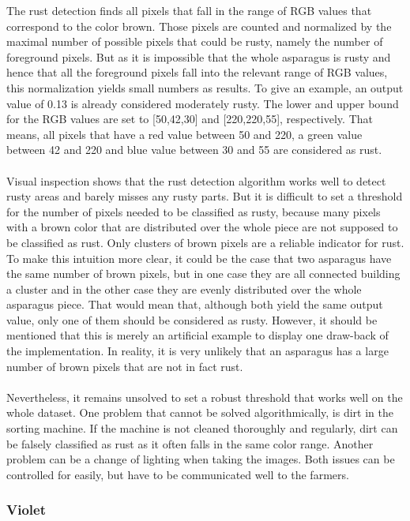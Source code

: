 The rust detection finds all pixels that fall in the range of RGB values that correspond to the color brown. Those pixels are counted and normalized by the maximal number of possible pixels that could be rusty, namely the number of foreground pixels. But as it is impossible that the whole asparagus is rusty and hence that all the foreground pixels fall into the relevant range of RGB values, this normalization yields small numbers as results. To give an example, an output value of 0.13 is already considered moderately rusty. The lower and upper bound for the RGB values are set to [50,42,30] and [220,220,55], respectively. That means, all pixels that have a red value between 50 and 220, a green value between 42 and 220 and blue value between 30 and 55 are considered as rust. \\
\\
Visual inspection shows that the rust detection algorithm works well to detect rusty areas and barely misses any rusty parts. But it is difficult to set a threshold for the number of pixels needed to be classified as rusty, because many pixels with a brown color that are distributed over the whole piece are not supposed to be classified as rust. Only clusters of brown pixels are a reliable indicator for rust. To make this intuition more clear, it could be the case that two asparagus have the same number of brown pixels, but in one case they are all connected building a cluster and in the other case they are evenly distributed over the whole asparagus piece. That would mean that, although both yield the same output value, only one of them should be considered as rusty. However, it should be mentioned that this is merely an artificial example to display one draw-back of the implementation. In reality, it is  very unlikely that an asparagus has a large number of brown pixels that are not in fact rust. \\
\\
Nevertheless, it remains unsolved to set a robust threshold that works well on the whole dataset. One problem that cannot be solved algorithmically, is dirt in the sorting machine. If the machine is not cleaned thoroughly and regularly, dirt can be falsely classified as rust as it often falls in the same color range. Another problem can be a change of lighting when taking the images. Both issues can be controlled for easily, but have to be communicated well to the farmers.

\subsubsection{Violet}
\label{subsec:Violet}

